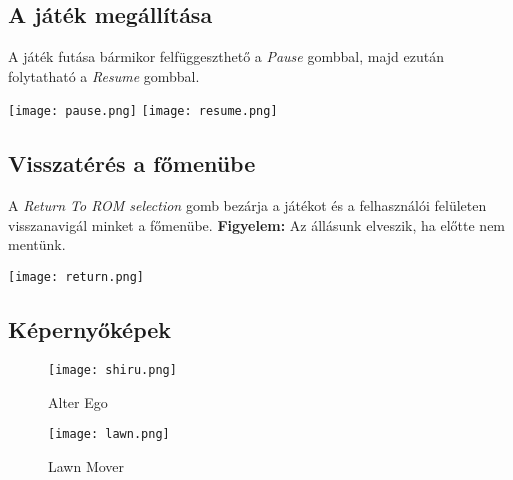 \subsection{A játék megállítása}

A játék futása bármikor felfüggeszthető a \emph{Pause} gombbal, majd ezután folytatható a \emph{Resume} gombbal.

\begin{center}
	\texttt{[image: pause.png]}
	\qquad
	\texttt{[image: resume.png]}
\end{center}

\subsection{Visszatérés a főmenübe}
A \emph{Return To ROM selection} gomb bezárja a játékot és a felhasználói felületen visszanavigál minket a főmenübe.
\newline \textbf{Figyelem:} Az állásunk elveszik, ha előtte nem mentünk. 
\vspace{0.3cm}
\begin{center}
	\texttt{[image: return.png]}
\end{center}

\subsection{Képernyőképek}
\begin{figure}[H]
	\centering
	\texttt{[image: shiru.png]}
	\caption{Alter Ego}
	\vspace{1cm}
	\texttt{[image: lawn.png]}
	\caption{Lawn Mover}
\end{figure}